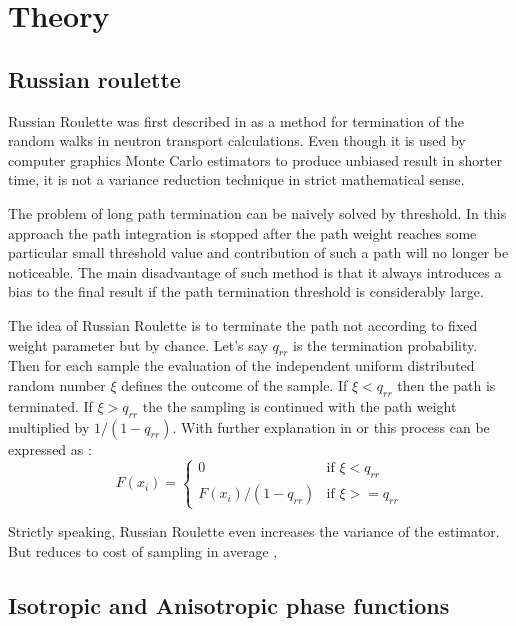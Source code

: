 \chapter{Theory}
\label{chapter:theory}



\section{Russian roulette}
\label{subsection:rr}
Russian Roulette was first described in \cite{hammersley64} as a method for termination of the
random walks in neutron transport calculations. Even though it is used by computer graphics Monte
Carlo estimators to produce unbiased result in shorter time, it is not a variance reduction
technique in strict mathematical sense. 

The problem of long path termination can be naively solved by threshold. In this approach the
path integration is stopped after the path weight reaches some particular small threshold value and
contribution of such a path will no longer be noticeable. The main disadvantage of such method is
that it always introduces a bias to the final result if the path termination threshold is
considerably large.

The idea of Russian Roulette is to terminate the path not according to fixed weight parameter but by
chance. Let's say $q_{rr}$ is the termination probability. Then for each sample the evaluation of
the independent uniform distributed random number $\xi$ defines the outcome of the sample. If
$\xi<q_{rr}$ then the path is terminated. If $\xi>q_{rr}$ the the sampling is continued with the
path weight multiplied by $1/(1-q_{rr})$. With further explanation in \cite{pharr2010physically}
or \cite{Veach:1998:RMC:927297} this process can be expressed as :
\[ F(x_i) = \begin{cases} 0 & \mbox{if } \xi<q_{rr} \\ F(x_i)/(1-q_{rr}) & \mbox{if } \xi>=q_{rr}
\end{cases}
\]

Strictly speaking, Russian Roulette even increases the variance of the estimator. But reduces to
cost of sampling in average \cite{Veach:1998:RMC:927297}, \cite{Csi03variancereduction}

\section{Isotropic and Anisotropic phase functions}
\label{section:phasefunction}


